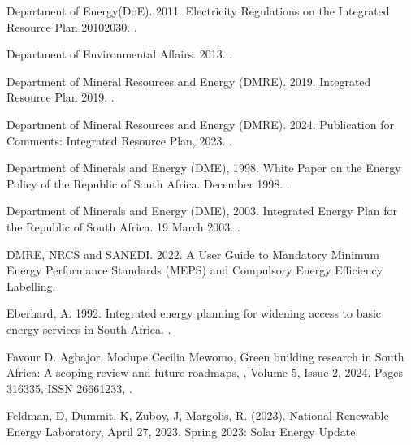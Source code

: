 \documentclass[letterpaper,10pt,english]{jupyterBook}
\begin{document}
\sphinxAtStartPar
Department of Energy(DoE). 2011. Electricity Regulations on the Integrated Resource Plan 2010\sphinxhyphen{}2030. .

\sphinxAtStartPar
Department of Environmental Affairs. 2013. .

\sphinxAtStartPar
Department of Mineral Resources and Energy (DMRE). 2019. Integrated Resource Plan 2019. .

\sphinxAtStartPar
Department of Mineral Resources and Energy (DMRE). 2024. Publication for Comments: Integrated Resource Plan, 2023. .

\sphinxAtStartPar
Department of Minerals and Energy (DME), 1998. White Paper on the Energy Policy of the Republic of South Africa. December 1998. .

\sphinxAtStartPar
Department of Minerals and Energy (DME), 2003. Integrated Energy Plan for the Republic of South Africa. 19 March 2003. .

\sphinxAtStartPar
DMRE, NRCS and SANEDI. 2022. A User Guide to Mandatory Minimum Energy Performance Standards (MEPS) and Compulsory Energy Efficiency Labelling. 

\sphinxAtStartPar
Eberhard, A. 1992. Integrated energy planning for widening access to basic energy services in South Africa. .

\sphinxAtStartPar
Favour D. Agbajor, Modupe Cecilia Mewomo, Green building research in South Africa: A scoping review and future roadmaps, , Volume 5, Issue 2, 2024, Pages 316\sphinxhyphen{}335, ISSN 2666\sphinxhyphen{}1233, .

\sphinxAtStartPar
Feldman, D, Dummit, K, Zuboy, J, Margolis, R. (2023). National Renewable Energy Laboratory, April 27, 2023. Spring 2023: Solar Energy Update. 
\end{document}
